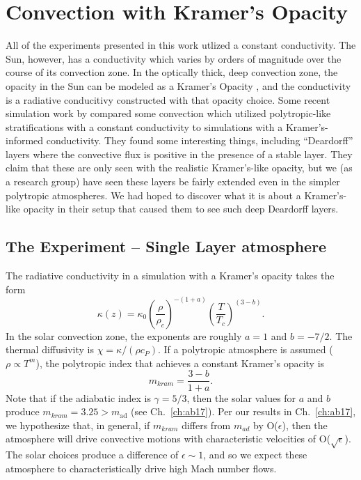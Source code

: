 \section{Convection with Kramer's Opacity}
All of the experiments presented in this work utlized a constant conductivity.
The Sun, however, has a conductivity which varies by orders of magnitude over the course of its convection zone.
In the optically thick, deep convection zone, the opacity in the Sun can be modeled as a Kramer's Opacity \citep[see e.g.,][]{brandenburg2016}, and the conductivity is a radiative conducitivy constructed with that opacity choice.
Some recent simulation work by \citet{kapyla&all2017} compared some convection which utilized polytropic-like stratifications with a constant conductivity to simulations with a Kramer's-informed conductivity.
They found some interesting things, including ``Deardorff'' layers where the convective flux is positive in the presence of a stable layer.
They claim that these are only seen with the realistic Kramer's-like opacity, but we (as a research group) have seen these layers be fairly extended even in the simpler polytropic atmospheres.
We had hoped to discover what it is about a Kramer's-like opacity in their setup that caused them to see such deep Deardorff layers.

\subsection{The Experiment -- Single Layer atmosphere}
The radiative conductivity in a simulation with a Kramer's opacity \citep{kapyla&all2017} takes the form
$$
\kappa(z) = \kappa_0 \left(\frac{\rho}{\rho_c}\right)^{-(1+a)} \left(\frac{T}{T_c}\right)^{(3-b)}.
$$
In the solar convection zone, the exponents are roughly $a = 1$ and $b = -7/2$.
The thermal diffusivity is $\chi = \kappa / (\rho c_P)$. 
If a polytropic atmosphere is assumed ($\rho \propto T^m$), the polytropic index that achieves a constant Kramer's opacity \citep{jones1976} is
$$
m_{kram} = \frac{3 - b}{1 + a}.
$$
Note that if the adiabatic index is $\gamma = 5/3$, then the solar values for $a$ and $b$ produce $m_{kram} = 3.25 > m_{\text{ad}}$ (see Ch.~\ref{ch:ab17}).
Per our results in Ch.~\ref{ch:ab17}, we hypothesize that, in general, if $m_{kram}$ differs from $m_{ad}$ by O($\epsilon$), then the atmosphere will drive convective motions with characteristic velocities of O($\sqrt{\epsilon}$).
The solar choices produce a difference of $\epsilon \sim 1$, and so we expect these atmosphere to characteristically drive high Mach number flows.

